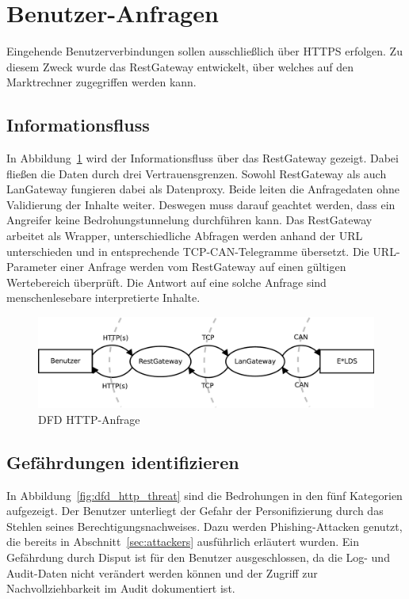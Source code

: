 \documentclass[11pt,a4paper]{report}
\begin{document}
\section{Benutzer-Anfragen} \label{sec:model_http}

Eingehende Benutzerverbindungen sollen ausschließlich über HTTPS erfolgen. Zu diesem Zweck wurde das RestGateway entwickelt, über welches auf den Marktrechner zugegriffen werden kann. 	

\subsection{Informationsfluss}

In Abbildung~\ref{fig:dfd_http} wird der Informationsfluss über das RestGateway gezeigt. Dabei fließen die Daten durch drei Vertrauensgrenzen. Sowohl RestGateway als auch LanGateway fungieren dabei als Datenproxy. Beide leiten die Anfragedaten ohne Validierung der Inhalte weiter. Deswegen muss darauf geachtet werden, dass ein Angreifer keine Bedrohungstunnelung durchführen kann. Das RestGateway arbeitet als Wrapper, unterschiedliche Abfragen werden anhand der URL unterschieden und in entsprechende TCP-CAN-Telegramme übersetzt. Die URL-Parameter einer Anfrage werden vom RestGateway auf einen gültigen Wertebereich überprüft. Die Antwort auf eine solche Anfrage sind menschenlesebare interpretierte Inhalte.

\begin{figure}[htbp]
\centering
\includegraphics[scale=0.6]{images/dfd_http.pdf}
\caption{DFD HTTP-Anfrage}
\label{fig:dfd_http}
\end{figure}

\subsection{Gefährdungen identifizieren}

In Abbildung~\ref{fig:dfd_http_threat} sind die Bedrohungen in den fünf Kategorien aufgezeigt. Der Benutzer unterliegt der Gefahr der Personifizierung durch das Stehlen seines Berechtigungsnachweises. Dazu werden Phishing-Attacken genutzt, die bereits in Abschnitt~\ref{sec:attackers} ausführlich erläutert wurden. Ein Gefährdung durch Disput ist für den Benutzer ausgeschlossen, da die Log- und Audit-Daten nicht verändert werden können und der Zugriff zur Nachvollziehbarkeit im Audit dokumentiert ist. 
\end{document}
